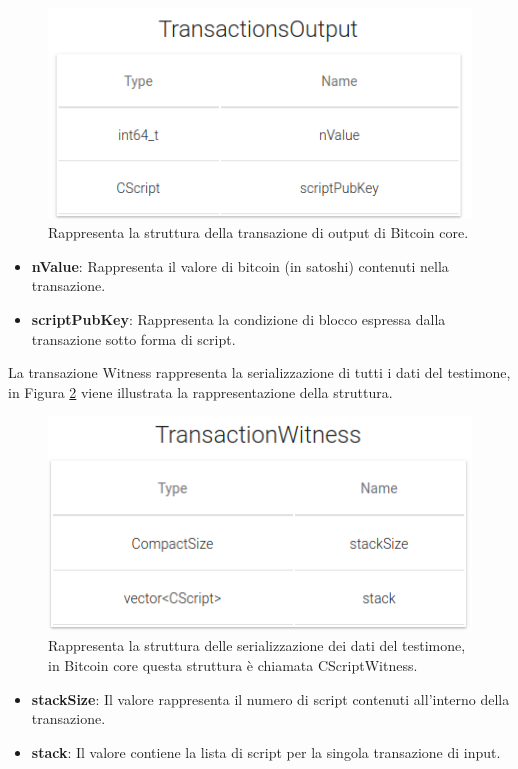 \begin{figure}[H]
\begin{center}
\includegraphics[width=0.6\columnwidth]{images/bitcoinstructs/output_tx.png}
\end{center}
\caption{Rappresenta la struttura della transazione di output di Bitcoin core.}
\label{fig:outpointbitcoinc}
\end{figure}

\begin{itemize}
  \item {\bf nValue\/}: Rappresenta il valore di bitcoin (in satoshi) contenuti nella transazione.
  \item {\bf scriptPubKey\/}: Rappresenta la condizione di blocco espressa dalla transazione sotto forma di script.
\end{itemize}

La transazione Witness rappresenta la serializzazione di tutti i dati del testimone, in Figura \ref{fig:witnesstxbitcoinc} viene illustrata la rappresentazione della struttura.

\begin{figure}[H]
\begin{center}
\includegraphics[width=0.6\columnwidth]{images/bitcoinstructs/tx_witness.png}
\end{center}
\caption{Rappresenta la struttura delle serializzazione dei dati del testimone, in Bitcoin core questa struttura è chiamata CScriptWitness.}
\label{fig:witnesstxbitcoinc}
\end{figure}

\begin{itemize}
  \item {\bf stackSize\/}: Il valore rappresenta il numero di script contenuti all’interno della transazione.
  \item {\bf stack\/}: Il valore contiene la lista di script per la singola transazione di input.
\end{itemize}

